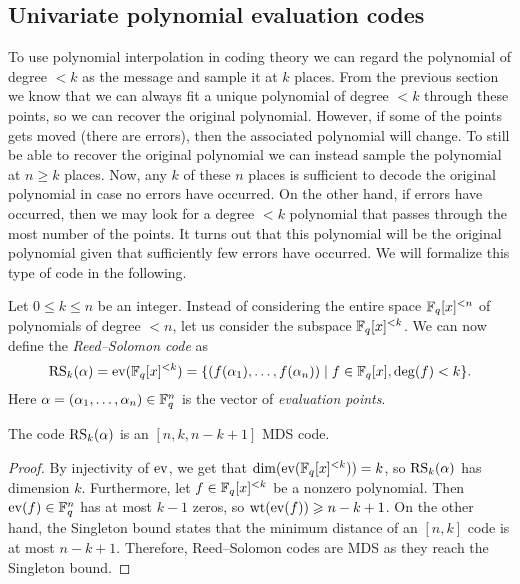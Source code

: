 \documentclass[../main.tex]{subfiles}
\begin{document}
\subsection{Univariate polynomial evaluation codes}

To use polynomial interpolation in coding theory we can regard the polynomial of degree $< k$ as the message and sample it at $k$ places. From the previous section we know that we can always fit a unique polynomial of degree $< k$ through these points, so we can recover the original polynomial. However, if some of the points gets moved (there are errors), then the associated polynomial will change. To still be able to recover the original polynomial we can instead sample the polynomial at $n \geq k$ places. Now, any $k$ of these $n$ places is sufficient to decode the original polynomial in case no errors have occurred. On the other hand, if errors have occurred, then we may look for a degree $< k$ polynomial that passes through the most number of the points. It turns out that this polynomial will be the original polynomial given that sufficiently few errors have occurred. We will formalize this type of code in the following.

Let $0 \leq k \leq n$ be an integer. Instead of considering the entire space $\mathbb{F}_q[x]^{< n}$ of polynomials of degree $< n$, let us consider the subspace $\mathbb{F}_q[x]^{< k}$. We can now define the \emph{Reed--Solomon code} as
\begin{equation*}
    \operatorname{RS}_k(\alpha) = \operatorname{ev}(\mathbb{F}_q[x]^{< k}) = \{ (f(\alpha_1), \dots, f(\alpha_n)) \mid f \in \mathbb{F}_q[x], \deg(f) < k \}.
\end{equation*}
Here $\alpha = (\alpha_1, \dots, \alpha_n) \in \mathbb{F}_q^n$ is the vector of \emph{evaluation points}.

\begin{theorem}\label{thm:RS_parameters}
The code $\operatorname{RS}_k(\alpha)$ is an $[n, k, n - k + 1]$ MDS code.
\end{theorem}

\begin{proof}
By injectivity of $\operatorname{ev}$, we get that $\dim(\operatorname{ev}(\mathbb{F}_q[x]^{< k})) = k$, so $\operatorname{RS}_k(\alpha)$ has dimension $k$. Furthermore, let $f \in \mathbb{F}_q[x]^{< k}$ be a nonzero polynomial. Then $\operatorname{ev}(f) \in \mathbb{F}_q^n$ has at most $k - 1$ zeros, so $\operatorname{wt}(\operatorname{ev}(f)) \geqslant n - k + 1$. On the other hand, the Singleton bound states that the minimum distance of an $[n, k]$ code is at most $n - k + 1$. Therefore, Reed--Solomon codes are MDS as they reach the Singleton bound.
\end{proof}
\end{document}
